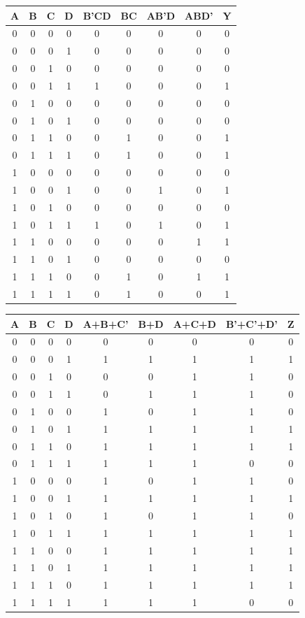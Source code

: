 \documentclass{article}
\begin{document}
    \begin{center}
        \begin{tabular}{ c|c|c|c|c|c|c|c|c }
            A & B & C & D & B'CD & BC & AB'D & ABD' & Y \\
            \hline
            0 & 0 & 0 & 0 & 0& 0& 0& 0& 0\\
            0 & 0 & 0 & 1 & 0& 0& 0& 0& 0\\
            0 & 0 & 1 & 0 & 0& 0& 0& 0& 0\\
            0 & 0 & 1 & 1 & 1& 0& 0& 0& 1\\
            0 & 1 & 0 & 0 & 0& 0& 0& 0& 0\\
            0 & 1 & 0 & 1 & 0& 0& 0& 0& 0\\
            0 & 1 & 1 & 0 & 0& 1& 0& 0& 1\\
            0 & 1 & 1 & 1 & 0& 1& 0& 0& 1\\
            1 & 0 & 0 & 0 & 0& 0& 0& 0& 0\\
            1 & 0 & 0 & 1 & 0& 0& 1& 0& 1\\
            1 & 0 & 1 & 0 & 0& 0& 0& 0& 0\\
            1 & 0 & 1 & 1 & 1& 0& 1& 0& 1\\
            1 & 1 & 0 & 0 & 0& 0& 0& 1& 1\\
            1 & 1 & 0 & 1 & 0& 0& 0& 0& 0\\
            1 & 1 & 1 & 0 & 0& 1& 0& 1& 1\\
            1 & 1 & 1 & 1 & 0& 1& 0& 0& 1
            
        \end{tabular}
        \begin{tabular}{ c|c|c|c|c|c|c|c|c }
            A & B & C & D & A+B+C' & B+D & A+C+D & B'+C'+D' & Z \\
            \hline
            0 & 0 & 0 & 0 & 0& 0& 0& 0& 0\\
            0 & 0 & 0 & 1 & 1& 1& 1& 1& 1\\
            0 & 0 & 1 & 0 & 0& 0& 1& 1& 0\\
            0 & 0 & 1 & 1 & 0& 1& 1& 1& 0\\
            0 & 1 & 0 & 0 & 1& 0& 1& 1& 0\\
            0 & 1 & 0 & 1 & 1& 1& 1& 1& 1\\
            0 & 1 & 1 & 0 & 1& 1& 1& 1& 1\\
            0 & 1 & 1 & 1 & 1& 1& 1& 0& 0\\
            1 & 0 & 0 & 0 & 1& 0& 1& 1& 0\\
            1 & 0 & 0 & 1 & 1& 1& 1& 1& 1\\
            1 & 0 & 1 & 0 & 1& 0& 1& 1& 0\\
            1 & 0 & 1 & 1 & 1& 1& 1& 1& 1\\
            1 & 1 & 0 & 0 & 1& 1& 1& 1& 1\\
            1 & 1 & 0 & 1 & 1& 1& 1& 1& 1\\
            1 & 1 & 1 & 0 & 1& 1& 1& 1& 1\\
            1 & 1 & 1 & 1 & 1& 1& 1& 0& 0
            

\end{tabular}
\end{center}
\end{document}
